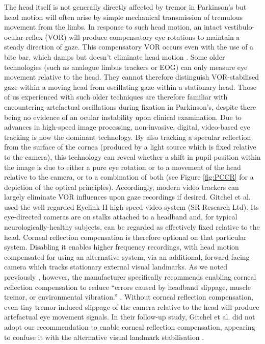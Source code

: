 \documentclass[jou,a4paper]{apa6}
\begin{document}
The head itself is not generally directly affected by tremor in Parkinson's but head motion will often arise by simple mechanical transmission of tremulous movement from the limbs. In response to such head motion, an intact vestibulo-ocular reflex (VOR) will produce compensatory eye rotations to maintain a steady direction of gaze. This compensatory VOR occurs even with the use of a bite bar, which damps but doesn't eliminate head motion \citep{Saifee2014Tremor-of-the-e}. Some older technologies (such as analogue limbus trackers or EOG) can only measure eye movement relative to the head. They cannot therefore distinguish VOR-stabilised gaze within a moving head from oscillating gaze within a stationary head. Those of us experienced with such older techniques \citep[e.g.][]{Anderson2008Oculomotor-func,Le-Heron2005Memory-guided-s,MacAskill2002Adaptive-modifi,MacAskill2002Saccadic-adapta} are therefore familiar with encountering artefactual oscillations during fixation in Parkinson's, despite there being no evidence of an ocular instability upon clinical examination. Due to advances in high-speed image processing, non-invasive, digital, video-based eye tracking is now the dominant technology. By also tracking a specular reflection from the surface of the cornea (produced by a light source which is fixed relative to the camera), this technology can reveal whether a shift in pupil position within the image is due to either a pure eye rotation or to a movement of the head relative to the camera, or to a combination of both (see Figure \ref{fig:PCCR} for a depiction of the optical principles). Accordingly, modern video trackers can largely eliminate VOR influences upon gaze recordings if desired.
Gitchel et al. used the well-regarded Eyelink II high-speed video system (SR Research Ltd). Its eye-directed cameras are on stalks attached to a headband and, for typical neurologically-healthy subjects, can be regarded as effectively fixed relative to the head. Corneal reflection compensation is therefore optional on that particular system. Disabling it enables higher frequency recordings, with head motion compensated for using an alternative system, via an additional, forward-facing camera which tracks stationary external visual landmarks. As we noted previously \citep{MacAskill2013Ocular-Tremor-i}, however, the manufacturer specifically recommends enabling corneal reflection compensation to reduce ``errors caused by headband slippage, muscle tremor, or environmental vibration.'' \citep{SR-Research-Ltd2002EyeLink-II-User}. Without corneal reflection compensation, even tiny tremor-induced slippage of the camera relative to the head will produce artefactual eye movement signals. In their follow-up study, Gitchel et al. did not adopt our recommendation to enable corneal reflection compensation, appearing to confuse it with the alternative visual landmark stabilisation \cite{Gitchel2014Experimental-su}.
\end{document}
